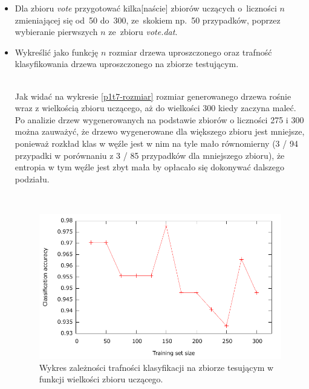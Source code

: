 \begin{itemize}
\item Dla zbioru \emph{vote} przygotować kilka[naście] zbiorów uczących o~liczności $n$ zmieniającej się od~50 do~300, ze~skokiem np.~50 przypadków, poprzez wybieranie pierwszych $n$ ze~zbioru \emph{vote.dat}.
\item Wykreślić jako funkcję $n$ rozmiar drzewa uproszczonego oraz trafność klasyfikowania drzewa uproszczonego na zbiorze testującym.

\\Jak widać na wykresie \ref{p1t7-rozmiar} rozmiar generowanego drzewa rośnie wraz z wielkością zbioru uczącego, aż do wielkości 300 kiedy zaczyna maleć. Po analizie drzew wygenerowanych na podstawie zbiorów o liczności 275 i 300 można zauważyć, że drzewo wygenerowane dla większego zbioru jest mniejsze, ponieważ rozkład klas w węźle jest w nim na tyle mało równomierny (3 / 94 przypadki w porównaniu z 3 / 85 przypadków dla mniejszego zbioru), że entropia w tym węźle jest zbyt mała by opłacało się dokonywać dalszego podziału.

\\

\begin{figure}	
	\includegraphics[scale=0.7]{figures/part1/task7/accuracy.pdf}
	\caption{Wykres zależności trafności klasyfikacji na zbiorze tesującym w funkcji wielkości zbioru uczącego.}
	\label{p1t7-trafnosc}
\end{figure}


\end{itemize}
